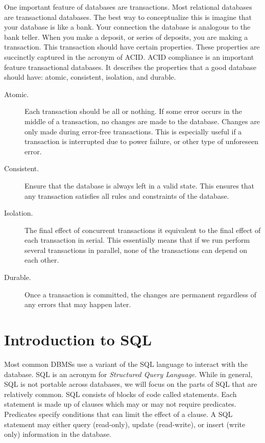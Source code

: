 One important feature of databases are transactions.
Most relational databases are transactional databases.
The best way to conceptualize this is imagine that your database is like a bank.
Your connection the database is analogous to the bank teller.
When you make a deposit, or series of deposits, you are making a transaction.
This transaction should have certain properties.
These properties are succinctly captured in the acronym of ACID.
ACID compliance is an important feature transactional databases.
It describes the properties that a good database should have: atomic, consistent, isolation, and durable.
\begin{description}
\item[Atomic.] Each transaction should be all or nothing.  If some error occurs in the middle of a transaction, no changes are made to the database.  Changes are only made during error-free transactions.  This is especially useful if a transaction is interrupted due to power failure, or other type of unforeseen error.
\item[Consistent.] Ensure that the database is always left in a valid state.  This ensures that any transaction satisfies all rules and constraints of the database.
\item[Isolation.] The final effect of concurrent transactions it equivalent to the final effect of each transaction in serial.  This essentially means that if we run perform several transactions in parallel, none of the transactions can depend on each other.
\item[Durable.] Once a transaction is committed, the changes are permanent regardless of any errors that may happen later.
\end{description}

\section*{Introduction to SQL}
Most common DBMSs use a variant of the SQL language to interact with the database.
SQL is an acronym for \emph{Structured Query Language}.
While in general, SQL is not portable across databases, we will focus on the parts of SQL that are relatively common.
SQL consists of blocks of code called statements.
Each statement is made up of clauses which may or may not require predicates.
Predicates specify conditions that can limit the effect of a clause.
A SQL statement may either query (read-only), update (read-write), or insert (write only) information in the database.

